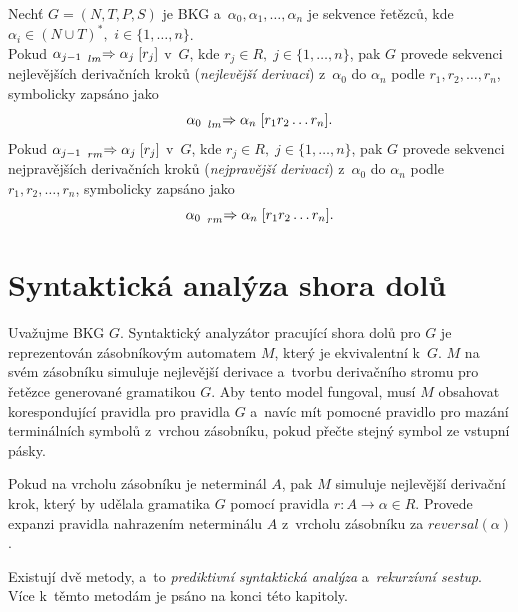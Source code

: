 \begin{definition}\label{def_sekvence_nejl_nejpr_der}
    Nechť $G = (N, T, P, S)$ je BKG a~$\alpha_0, \alpha_1, \ldots, \alpha_n$ je sekvence řetězců, kde $\alpha_i \in (N \cup T)^*,$ $i \in \{1, \ldots, n\}$.\\
    Pokud $\alpha_{j-1}\; \prescript{}{\scriptstyle lm}{\Rightarrow}\; \alpha_j\; [r_j]$ v~$G$, kde $r_j \in R,\; j \in \{1, \ldots, n\}$, pak $G$ provede sekvenci nejlevějších derivačních kroků (\emph{nejlevější derivaci}) z~$\alpha_0$ do $\alpha_n$ podle $r_1, r_2, \ldots, r_n$, symbolicky zapsáno jako
    \begin{equation*}
        \alpha_0\; \prescript{}{\scriptstyle lm}{\Rightarrow}\; \alpha_n\; [r_1r_2\ldots r_n].
    \end{equation*} 
    Pokud $\alpha_{j-1}\; \prescript{}{\scriptstyle rm}{\Rightarrow}\; \alpha_j\; [r_j]$ v~$G$, kde $r_j \in R,\; j \in \{1, \ldots, n\}$, pak $G$ provede sekvenci nejpravějších derivačních kroků (\emph{nejpravější derivaci}) z~$\alpha_0$ do $\alpha_n$ podle $r_1, r_2, \ldots, r_n$, symbolicky zapsáno jako
    \begin{equation*}
        \alpha_0\; \prescript{}{\scriptstyle rm}{\Rightarrow}\; \alpha_n\; [r_1r_2\ldots r_n].
    \end{equation*}
\end{definition}


\section{Syntaktická analýza shora dolů}\label{kap_sa_shora_dolu}
Uvažujme BKG $G$.
Syntaktický analyzátor pracující shora dolů pro $G$ je reprezentován zásobníkovým automatem $M$, který je ekvivalentní k~$G$.
$M$ na svém zásobníku simuluje nejlevější derivace a~tvorbu derivačního stromu pro řetězce generované gramatikou $G$.
Aby tento model fungoval, musí $M$ obsahovat korespondující pravidla pro pravidla $G$ a~navíc mít pomocné pravidlo pro mazání terminálních symbolů z~vrchou zásobníku, pokud přečte stejný symbol ze vstupní pásky.

Pokud na vrcholu zásobníku je neterminál $A$, pak $M$ simuluje nejlevější derivační krok, který by udělala gramatika $G$ pomocí pravidla $r: A \rightarrow \alpha \in R$.
Provede expanzi pravidla nahrazením neterminálu $A$ z~vrcholu zásobníku za $reversal(\alpha)$. 

Existují dvě metody, a~to \emph{prediktivní syntaktická analýza} a~\emph{rekurzívní sestup}.
Více k~těmto metodám je psáno na konci této kapitoly.

